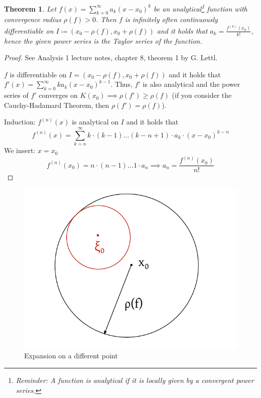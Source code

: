 \documentclass{article}
\newtheorem{theorem}{Theorem}  \numberwithin{theorem}{section}
\begin{document}
\begin{theorem} %
  Let $f(x) = \sum_{k=0}^\infty a_k (x - x_0)^k$ be an analytical\footnote{Reminder: A function is analytical if it is locally given by a convergent power series.} function with convergence radius $\rho(f) > 0$.
  Then $f$ is infinitely often continuously differentiable on $I \coloneqq (x_0 - \rho(f), x_0 + \rho(f))$
  and it holds that $a_k = \frac{f^{(k)}(x_0)}{k!}$, hence the given power series is the Taylor series of the function.
\end{theorem}

\begin{proof}
  See Analysis 1 lecture notes, chapter 8, theorem 1 by G. Lettl.

  $f$ is differentiable on $I = (x_0 - \rho(f), x_0 + \rho(f))$ and it holds that $f'(x) = \sum_{k=0}^\infty k a_k (x - x_0)^{k-1}$.
  Thus, $f'$ is also analytical and the power series of $f'$ converges on $K(x_0) \implies \rho(f') \geq \rho(f)$
  (if you consider the Cauchy-Hadamard Theorem, then $\rho(f') = \rho(f)$).

  Induction:
  $f^{(n)}(x)$ is analytical on $I$ and it holds that
  \[ f^{(n)}(x) = \sum_{k=n}^\infty k \cdot (k - 1) \dots (k - n + 1) \cdot a_k \cdot (x - x_0)^{k-n} \]
  We insert: $x = x_0$
  \[ f^{(n)}(x_0) = n \cdot (n - 1) \dots 1 \cdot a_n \implies a_n = \frac{f^{(n)}(x_0)}{n!} \]
\end{proof}

\begin{figure}[t]
  \begin{center}
    \includegraphics{img/29_expansion_on_a_different_point.pdf}
    \caption{Expansion on a different point}
    \label{img:expan}
  \end{center}
\end{figure}
\end{document}

